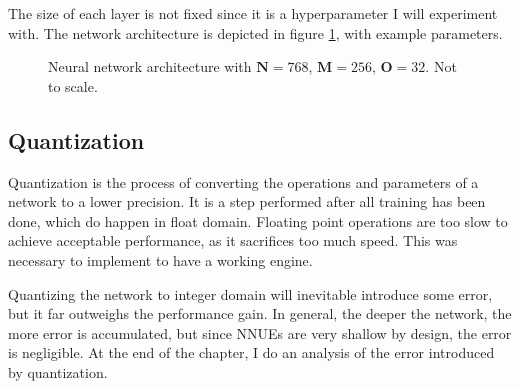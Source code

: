 The size of each layer is not fixed since it is a hyperparameter I will experiment with. The network architecture is depicted in figure \ref{fig:network}, with example parameters.

\begin{figure}[H]
\centering
{}
\caption{Neural network architecture with $\bm{N}=768$, $\bm{M}=256$, $\bm{O}=32$. Not to scale.}
\label{fig:network}
\end{figure}

\subsection{Quantization}


Quantization is the process of converting the operations and parameters of a network to a lower precision. It is a step performed after all training has been done, which do happen in float domain. Floating point operations are too slow to achieve acceptable performance, as it sacrifices too much speed. This was necessary to implement to have a working engine.

Quantizing the network to integer domain will inevitable introduce some error, but it far outweighs the performance gain. In general, the deeper the network, the more error is accumulated, but since NNUEs are very shallow by design, the error is negligible. At the end of the chapter, I do an analysis of the error introduced by quantization.

